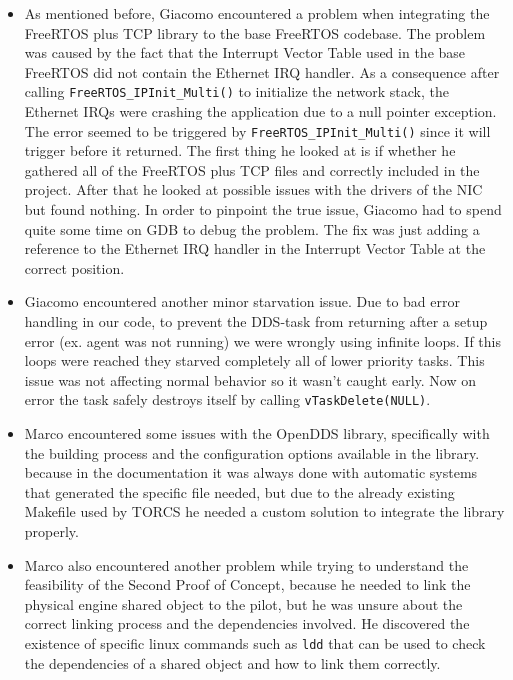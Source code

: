\documentclass[10pt,a4]{article}
\begin{document}
\begin{itemize}
  \item As mentioned before, Giacomo encountered a problem when integrating the FreeRTOS plus TCP library to the base FreeRTOS codebase. The problem was
        caused by the fact that the Interrupt Vector Table used in the base FreeRTOS did not contain the Ethernet IRQ handler.
        As a consequence after calling \texttt{FreeRTOS\_IPInit\_Multi()} to initialize the network stack, the Ethernet IRQs were crashing the application
        due to a null pointer exception. The error seemed to be triggered by \texttt{FreeRTOS\_IPInit\_Multi()} since it will trigger before it returned.
        The first thing he looked at is if whether he gathered all of the FreeRTOS plus TCP files and correctly included in the project.
        After that he looked at possible issues with the drivers of the NIC but found nothing.
        In order to pinpoint the true issue, Giacomo had to spend quite some time on GDB to debug the problem. The fix was just adding a
        reference to the Ethernet IRQ handler in the Interrupt Vector Table at the correct position.

  \item Giacomo encountered another minor starvation issue. Due to bad error handling in our code, to prevent the DDS-task from returning
        after a setup error (ex. agent was not running) we were wrongly using infinite loops. If this loops were reached they starved completely all of lower priority tasks.
        This issue was not affecting normal behavior so it wasn't caught early. Now on error the task safely destroys itself by calling \texttt{vTaskDelete(NULL)}.

  \item Marco encountered some issues with the OpenDDS library, specifically with the building process and the configuration options available in the library.
        because in the documentation it was always done with automatic systems that generated the specific file needed, but due to the already existing Makefile
        used by TORCS he needed a custom solution to integrate the library properly.

  \item Marco also encountered another problem while trying to understand the feasibility of the Second Proof of Concept, because he needed to link the physical
        engine shared object to the pilot, but he was unsure about the correct linking process and the dependencies involved. He discovered the existence of
        specific linux commands such as \texttt{ldd} that can be used to check the dependencies of a shared object and how to link them correctly.

\end{itemize}
\end{document}
